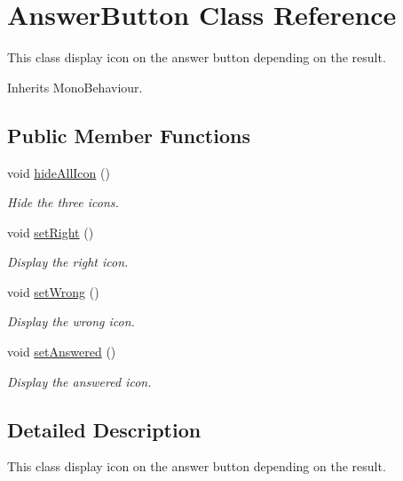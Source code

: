 \hypertarget{class_answer_button}{\section{Answer\-Button Class Reference}
\label{class_answer_button}
}


This class display icon on the answer button depending on the result. 




Inherits Mono\-Behaviour.

\subsection*{Public Member Functions}
\begin{DoxyCompactItemize}
\item 
void \hyperlink{class_answer_button_accf3ed60dc86c3523157731d8da0780c}{hide\-All\-Icon} ()
\begin{DoxyCompactList}\small\item\em Hide the three icons.\end{DoxyCompactList}\item 
void \hyperlink{class_answer_button_a80387795ba1ccc9503596d090ae0f813}{set\-Right} ()
\begin{DoxyCompactList}\small\item\em Display the right icon.\end{DoxyCompactList}\item 
void \hyperlink{class_answer_button_a33bf2925525f4f404506efe27863f67e}{set\-Wrong} ()
\begin{DoxyCompactList}\small\item\em Display the wrong icon.\end{DoxyCompactList}\item 
void \hyperlink{class_answer_button_a96feb155eee499a4f3d76eca4988ad92}{set\-Answered} ()
\begin{DoxyCompactList}\small\item\em Display the answered icon.\end{DoxyCompactList}\end{DoxyCompactItemize}


\subsection{Detailed Description}
This class display icon on the answer button depending on the result.



